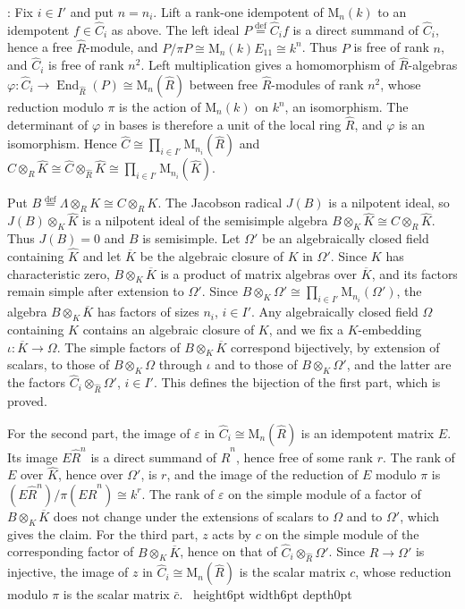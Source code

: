 \documentclass[leqno]{article}
\newcommand{\M}{\mathrm{M}}
\newcommand{\qed}{\hfill \vrule height6pt  width6pt depth0pt}
\newcommand{\co}{\colon}
\newcommand{\ot}{\otimes}
\newcommand{\ovl}{\overline}
\newcommand{\ov}{\overset}
\newcommand{\epsi}{\varepsilon}
\newenvironment{proof}[1][]{\noindent {\it Proof #1} : }{\hbox{~}\qed
\smallskip
}
\numberwithin{equation}{section}
\begin{document}
\begin{proof}
Fix $i \in I'$ and put $n = n_i$. Lift a rank-one idempotent of $\M_n(k)$ to an idempotent $f \in \hat C_i$ as above. The left ideal $P \ov{\mathrm{def}}{=} \hat C_i f$ is a direct summand of $\hat C_i$, hence a free $\hat R$-module, and $P/\pi P \cong \M_n(k) E_{11} \cong k^n$. Thus $P$ is free of rank $n$, and $\hat C_i$ is free of rank $n^2$. Left multiplication gives a homomorphism of $\hat R$-algebras $\varphi \co \hat C_i \to \operatorname{End}_{\hat R}(P) \cong \M_n(\hat R)$ between free $\hat R$-modules of rank $n^2$, whose reduction modulo $\pi$ is the action of $\M_n(k)$ on $k^n$, an isomorphism. The determinant of $\varphi$ in bases is therefore a unit of the local ring $\hat R$, and $\varphi$ is an isomorphism. Hence $\hat C \cong \prod_{i \in I'} \M_{n_i}(\hat R)$ and $C \ot_R \hat K \cong \hat C \ot_{\hat R} \hat K \cong \prod_{i \in I'} \M_{n_i}(\hat K)$.

Put $B \ov{\mathrm{def}}{=} \Lambda \ot_R K \cong C \ot_R K$. The Jacobson radical $J(B)$ is a nilpotent ideal, so $J(B) \ot_K \hat K$ is a nilpotent ideal of the semisimple algebra $B \ot_K \hat K \cong C \ot_R \hat K$. Thus $J(B) = 0$ and $B$ is semisimple. Let $\Omega'$ be an algebraically closed field containing $\hat K$ and let $\ovl K$ be the algebraic closure of $K$ in $\Omega'$. Since $K$ has characteristic zero, $B \ot_K \ovl K$ is a product of matrix algebras over $\ovl K$, and its factors remain simple after extension to $\Omega'$. Since $B \ot_K \Omega' \cong \prod_{i \in I'} \M_{n_i}(\Omega')$, the algebra $B \ot_K \ovl K$ has factors of sizes $n_i$, $i \in I'$. Any algebraically closed field $\Omega$ containing $K$ contains an algebraic closure of $K$, and we fix a $K$-embedding $\iota \co \ovl K \to \Omega$. The simple factors of $B \ot_K \ovl K$ correspond bijectively, by extension of scalars, to those of $B \ot_K \Omega$ through $\iota$ and to those of $B \ot_K \Omega'$, and the latter are the factors $\hat C_i \ot_{\hat R} \Omega'$, $i \in I'$. This defines the bijection of the first part, which is proved.

For the second part, the image of $\epsi$ in $\hat C_i \cong \M_n(\hat R)$ is an idempotent matrix $E$. Its image $E \hat R^n$ is a direct summand of $\hat R^n$, hence free of some rank $r$. The rank of $E$ over $\hat K$, hence over $\Omega'$, is $r$, and the image of the reduction of $E$ modulo $\pi$ is $(E\hat R^n)/\pi(E \hat R^n) \cong k^r$. The rank of $\epsi$ on the simple module of a factor of $B \ot_K \ovl K$ does not change under the extensions of scalars to $\Omega$ and to $\Omega'$, which gives the claim. For the third part, $z$ acts by $c$ on the simple module of the corresponding factor of $B \ot_K \ovl K$, hence on that of $\hat C_i \ot_{\hat R} \Omega'$. Since $\hat R \to \Omega'$ is injective, the image of $z$ in $\hat C_i \cong \M_n(\hat R)$ is the scalar matrix $c$, whose reduction modulo $\pi$ is the scalar matrix $\bar c$.
\end{proof}
\end{document}
